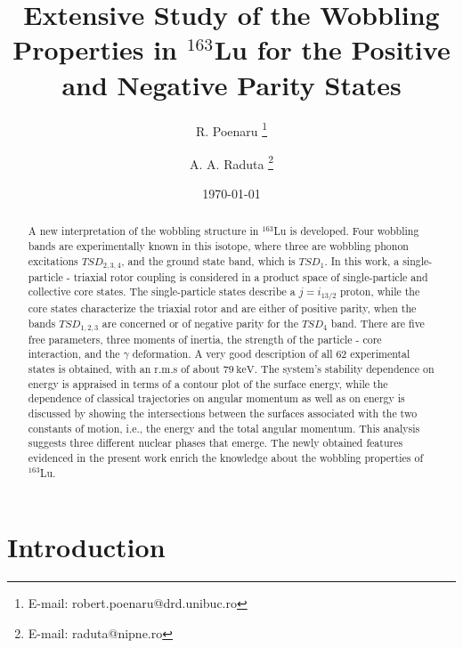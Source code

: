 \documentclass[11pt]{article}
\title{Extensive Study of the Wobbling Properties in $^{163}$Lu for the Positive and Negative Parity States}
\author[1,2]{R. Poenaru \thanks{E-mail: robert.poenaru@drd.unibuc.ro}}
\author[2,3]{A. A. Raduta \thanks{E-mail: raduta@nipne.ro}}
\affil[1]{Doctoral School of Physics, University of Bucharest, Romania}
\affil[2]{\textit{Horia Hulubei} National Institute for Physics and Nuclear Engineering, M\u{a}gurele-Bucharest, Romania}
\affil[3]{Academy of Romanian Scientists, Bucharest, Romania}
\date{\today}
\begin{document}
\maketitle

\begin{abstract}
A new interpretation of the wobbling structure in $^{163}$Lu is developed. Four wobbling bands are experimentally known in this isotope, where three are wobbling phonon excitations $TSD_{2,3,4}$, and the ground state band, which is $TSD_1$. In this work, a single-particle - triaxial rotor coupling is considered in a product space of single-particle and collective core states. The single-particle states describe a $j=i_{13/2}$ proton, while the core states characterize the triaxial rotor and are either of positive parity, when the bands $TSD_{1,2,3}$ are concerned or of negative parity for the $TSD_4$ band. There are five free parameters, three moments of inertia, the strength of the particle - core interaction, and the $\gamma$ deformation. A very good description of all 62 experimental states is obtained, with an r.m.s of about $79\ \text{keV}$. The system's stability dependence on energy is appraised in terms of a contour plot of the surface energy, while the dependence of classical trajectories on angular momentum as well as on energy is discussed by showing the intersections between the surfaces associated with the two constants of motion, i.e., the energy and the total angular momentum. This analysis suggests three different nuclear phases that emerge. The newly obtained features evidenced in the present work enrich the knowledge about the wobbling properties of $^{163}$Lu.
\end{abstract}


\section{Introduction}
\end{document}
